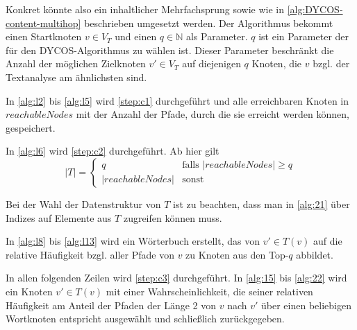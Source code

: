 Konkret könnte also ein inhaltlicher Mehrfachsprung sowie wie in
\cref{alg:DYCOS-content-multihop} beschrieben umgesetzt werden.
Der Algorithmus bekommt einen Startknoten $v \in V_T$ und
einen $q \in \mathbb{N}$ als Parameter. $q$ ist ein Parameter der
für den DYCOS-Algorithmus zu wählen ist. Dieser Parameter beschränkt 
die Anzahl der möglichen Zielknoten $v' \in V_T$ auf diejenigen
$q$ Knoten, die $v$ bzgl. der Textanalyse am ähnlichsten sind.

In \cref{alg:l2} bis \cref{alg:l5} wird \cref{step:c1} durchgeführt
und alle erreichbaren Knoten in $reachableNodes$ mit der Anzahl
der Pfade, durch die sie erreicht werden können, gespeichert.

In \cref{alg:l6} wird \cref{step:c2} durchgeführt. 
Ab hier gilt
\[ |T| = \begin{cases}q               &\text{falls } |reachableNodes|\geq q\\
                     |reachableNodes| &\text{sonst }\end{cases}\]

Bei der Wahl der Datenstruktur von $T$ ist zu beachten, dass man in
\cref{alg:21} über Indizes auf Elemente aus $T$ zugreifen können muss.

In \cref{alg:l8} bis \cref{alg:l13} wird ein Wörterbuch erstellt,
das von $v' \in T(v)$ auf die relative
Häufigkeit bzgl. aller Pfade von $v$ zu Knoten aus den Top-$q$ abbildet.

In allen folgenden Zeilen wird \cref{step:c3} durchgeführt. 
In \cref{alg:15} bis \cref{alg:22} wird ein Knoten $v' \in T(v)$ mit
einer Wahrscheinlichkeit, die seiner relativen Häufigkeit am Anteil
der Pfaden der Länge 2 von $v$ nach $v'$ über einen beliebigen 
Wortknoten entspricht ausgewählt und schließlich zurückgegeben.

